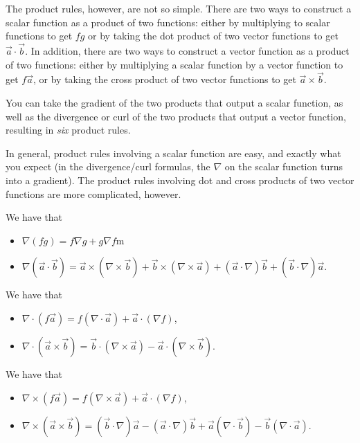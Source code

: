 The product rules, however, are not so simple.
There are two ways to construct a scalar function as a product of two functions:
either by multiplying to scalar functions to get $fg$
or by taking the dot product of two vector functions to get $\vec{a}\cdot\vec{b}$.
In addition, there are two ways to construct a vector function as a product of two functions:
either by multiplying a scalar function by a vector function to get $f\vec{a}$,
or by taking the cross product of two vector functions to get $\vec{a}\times\vec{b}$.

You can take the gradient of the two products that output a scalar function,
as well as the divergence or curl of the two products that output a vector function,
resulting in \textit{six} product rules.

In general, product rules involving a scalar function are easy, and exactly what you expect (in the divergence/curl formulas, the $\nabla$ on the scalar function turns into a gradient). The product rules involving dot and cross products of two vector functions are more complicated, however.

\begin{proposition}
    We have that
    \begin{itemize}
        \item $\nabla(fg)=f\nabla g+g\nabla f$m
        \item $\nabla(\vec{a}\cdot\vec{b}) = \vec{a}\times(\nabla\times \vec{b}) + \vec{b}\times(\nabla\times \vec{a})+(\vec{a}\cdot\nabla)\vec{b}+(\vec{b}\cdot\nabla)\vec{a}$.
    \end{itemize}
\end{proposition}

\begin{proposition}
    We have that
    \begin{itemize}
        \item $\nabla\cdot(f\vec{a})=f(\nabla\cdot\vec{a})+\vec{a}\cdot(\nabla f)$,
        \item $\nabla\cdot(\vec{a}\times\vec{b})=\vec{b}\cdot(\nabla\times\vec{a})-\vec{a}\cdot(\nabla\times\vec{b})$.
    \end{itemize}
\end{proposition}

\begin{proposition}
    We have that
    \begin{itemize}
        \item $\nabla\times(f\vec{a})=f(\nabla\times\vec{a})+\vec{a}\cdot(\nabla f)$,
        \item $\nabla\times(\vec{a}\times\vec{b})=(\vec{b}\cdot \nabla)\vec{a}-(\vec{a}\cdot\nabla)\vec{b}+\vec{a}(\nabla\cdot\vec{b})-\vec{b}(\nabla\cdot\vec{a})$.
    \end{itemize}
\end{proposition}

